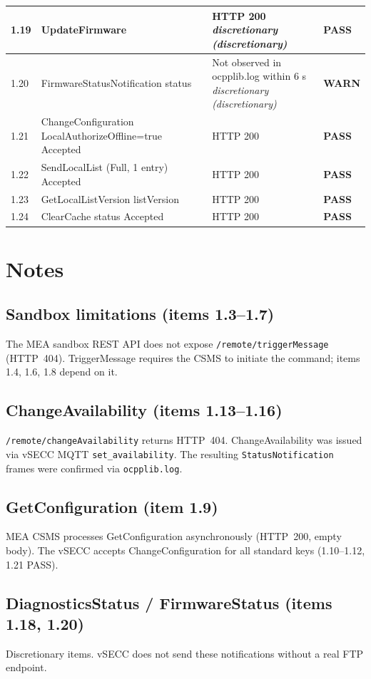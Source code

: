 \documentclass[10pt, a4paper]{article}
\begin{document}
\begin{longtable}{|L{1cm}|L{5.5cm}|M{7cm}|C{1.8cm}|}
\hline
\small 1.19 & \small UpdateFirmware & HTTP 200{\newline\normalfont\footnotesize\itshape *discretionary (discretionary)} & \textcolor{passgreen}{\textbf{PASS}} \\
\hline
\small 1.20 & \small FirmwareStatusNotification  status & Not observed in ocpplib.log within 6 s{\newline\normalfont\footnotesize\itshape *discretionary (discretionary)} & \textcolor{warnorange}{\textbf{WARN}} \\
\hline
\small 1.21 & \small ChangeConfiguration LocalAuthorizeOffline=true  Accepted & HTTP 200 & \textcolor{passgreen}{\textbf{PASS}} \\
\hline
\small 1.22 & \small SendLocalList (Full, 1 entry)  Accepted & HTTP 200 & \textcolor{passgreen}{\textbf{PASS}} \\
\hline
\small 1.23 & \small GetLocalListVersion  listVersion & HTTP 200 & \textcolor{passgreen}{\textbf{PASS}} \\
\hline
\small 1.24 & \small ClearCache  status Accepted & HTTP 200 & \textcolor{passgreen}{\textbf{PASS}} \\
\hline
\end{longtable}
\normalsize

\section{Notes}

\subsection*{Sandbox limitations (items 1.3--1.7)}
The MEA sandbox REST API does not expose \texttt{/remote/triggerMessage} (HTTP~404).
TriggerMessage requires the CSMS to initiate the command; items 1.4, 1.6, 1.8 depend on it.

\subsection*{ChangeAvailability (items 1.13--1.16)}
\texttt{/remote/changeAvailability} returns HTTP~404.
ChangeAvailability was issued via vSECC MQTT \texttt{set\_availability}.
The resulting \texttt{StatusNotification} frames were confirmed via \texttt{ocpplib.log}.

\subsection*{GetConfiguration (item 1.9)}
MEA CSMS processes GetConfiguration asynchronously (HTTP~200, empty body).
The vSECC accepts ChangeConfiguration for all standard keys (1.10--1.12, 1.21 PASS).

\subsection*{DiagnosticsStatus / FirmwareStatus (items 1.18, 1.20)}
Discretionary items. vSECC does not send these notifications without a real FTP endpoint.
\end{document}
